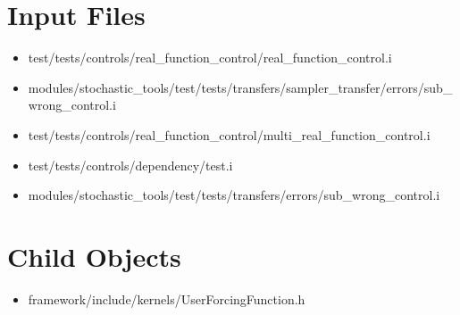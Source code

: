 \section{\label{input-files}Input Files}
\begin{itemize}
\item test/tests/controls/real\_function\_control/real\_function\_control.i
\item modules/stochastic\_tools/test/tests/transfers/sampler\_transfer/errors/sub\_wrong\_control.i
\item test/tests/controls/real\_function\_control/multi\_real\_function\_control.i
\item test/tests/controls/dependency/test.i
\item modules/stochastic\_tools/test/tests/transfers/errors/sub\_wrong\_control.i
\end{itemize}

\section{\label{child-objects}Child Objects}
\begin{itemize}
\item framework/include/kernels/UserForcingFunction.h
\end{itemize}
